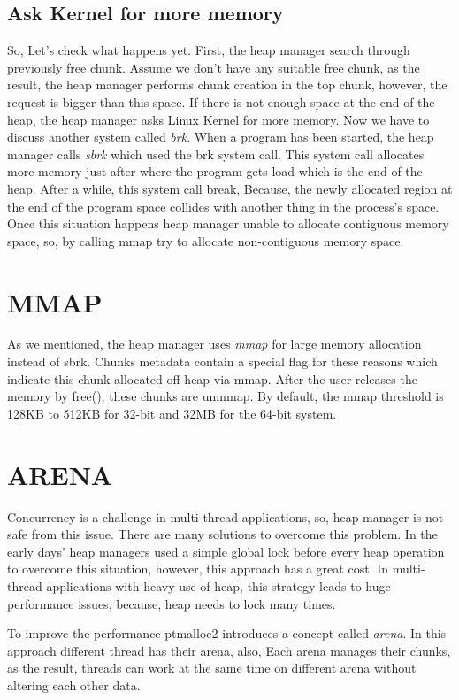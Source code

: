 \documentclass{masterthesis}
\begin{document}
\subsection{Ask Kernel for more memory}
So, Let's check what happens yet. First, the heap manager search through previously free chunk. Assume we don't have any suitable free chunk, as the result, the heap manager performs chunk creation in the top chunk, however, the request is bigger than this space. If there is not enough space at the end of the heap, the heap manager asks Linux Kernel for more memory. Now we have to discuss another system called \emph{brk}. When a program has been started, the heap manager calls \emph{sbrk} which used the brk system call. This system call allocates more memory just after where the program gets load which is the end of the heap. 
After a while, this system call break, Because, the newly allocated region at the end of the program space collides with another thing in the process’s space. Once this situation happens heap manager unable to allocate contiguous memory space, so, by calling mmap try to allocate non-contiguous memory space. 

\section{MMAP}
As we mentioned, the heap manager uses \emph{mmap} for large memory allocation instead of sbrk. Chunks metadata contain a special flag for these reasons which indicate this chunk allocated off-heap via mmap. After the user releases the memory by free(), these chunks are unmmap. By default, the mmap threshold is 128KB to 512KB for 32-bit and 32MB for the 64-bit system.

\section{ARENA}
Concurrency is a challenge in multi-thread applications, so, heap manager is not safe from this issue. There are many solutions to overcome this problem. In the early days' heap managers used a simple global lock before every heap operation to overcome this situation, however, this approach has a great cost. In multi-thread applications with heavy use of heap, this strategy leads to huge performance issues, because, heap needs to lock many times.

To improve the performance ptmalloc2 introduces a concept called \emph{arena}. In this approach different thread has their arena, also, Each arena manages their chunks, as the result, threads can work at the same time on different arena without altering each other data.
\end{document}
